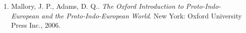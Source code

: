 \begin{enumerate}
\item Mallory, J. P., Adams, D. Q.. \textit{The Oxford Introduction to Proto-Indo-European and the Proto-Indo-European World}. New York: Oxford University Press Inc., 2006.
\end{enumerate}